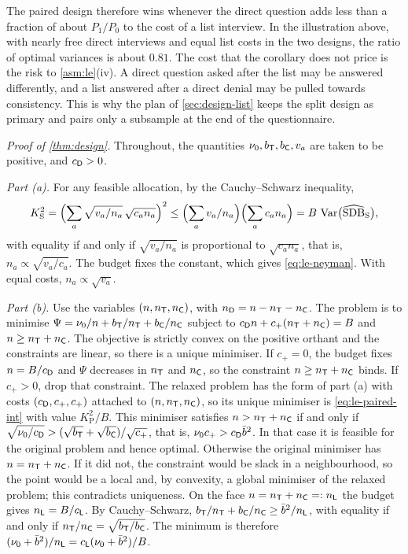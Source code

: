 The paired design therefore wins whenever the direct question adds less than a fraction of about $P_1/P_0$ to the cost of a list interview. In the illustration above, with nearly free direct interviews and equal list costs in the two designs, the ratio of optimal variances is about $0.81$. The cost that the corollary does not price is the risk to \cref{asm:le}(iv). A direct question asked after the list may be answered differently, and a list answered after a direct denial may be pulled towards consistency. This is why the plan of \cref{sec:design-list} keeps the split design as primary and pairs only a subsample at the end of the questionnaire.

\emph{Proof of \cref{thm:design}.} Throughout, the quantities $\nu_0,b_{\mathsf{T}},b_{\mathsf{C}},v_a$ are taken to be positive, and $c_{\mathsf{D}}>0$.

\emph{Part (a).} For any feasible allocation, by the Cauchy--Schwarz inequality,
\[
  K_{\mathrm S}^2=\Bigl(\sum_a\sqrt{v_a/n_a}\,\sqrt{c_an_a}\Bigr)^2\le\Bigl(\sum_av_a/n_a\Bigr)\Bigl(\sum_ac_an_a\Bigr)=B\,\operatorname{Var}\bigl(\widehat{\mathrm{SDB}}_{\mathrm S}\bigr),
\]
with equality if and only if $\sqrt{v_a/n_a}$ is proportional to $\sqrt{c_an_a}$, that is, $n_a\propto\sqrt{v_a/c_a}$. The budget fixes the constant, which gives \eqref{eq:le-neyman}. With equal costs, $n_a\propto\sqrt{v_a}$.

\emph{Part (b).} Use the variables $(n,n_{\mathsf{T}},n_{\mathsf{C}})$, with $n_{\mathsf{D}}=n-n_{\mathsf{T}}-n_{\mathsf{C}}$. The problem is to minimise $\Psi=\nu_0/n+b_{\mathsf{T}}/n_{\mathsf{T}}+b_{\mathsf{C}}/n_{\mathsf{C}}$ subject to $c_{\mathsf{D}}n+c_+(n_{\mathsf{T}}+n_{\mathsf{C}})=B$ and $n\ge n_{\mathsf{T}}+n_{\mathsf{C}}$. The objective is strictly convex on the positive orthant and the constraints are linear, so there is a unique minimiser. If $c_+=0$, the budget fixes $n=B/c_{\mathsf{D}}$ and $\Psi$ decreases in $n_{\mathsf{T}}$ and $n_{\mathsf{C}}$, so the constraint $n\ge n_{\mathsf{T}}+n_{\mathsf{C}}$ binds. If $c_+>0$, drop that constraint. The relaxed problem has the form of part (a) with costs $(c_{\mathsf{D}},c_+,c_+)$ attached to $(n,n_{\mathsf{T}},n_{\mathsf{C}})$, so its unique minimiser is \eqref{eq:le-paired-int} with value $K_{\mathrm P}^2/B$. This minimiser satisfies $n>n_{\mathsf{T}}+n_{\mathsf{C}}$ if and only if $\sqrt{\nu_0/c_{\mathsf{D}}}>(\sqrt{b_{\mathsf{T}}}+\sqrt{b_{\mathsf{C}}})/\sqrt{c_+}$, that is, $\nu_0c_+>c_{\mathsf{D}}\bar b^2$. In that case it is feasible for the original problem and hence optimal. Otherwise the original minimiser has $n=n_{\mathsf{T}}+n_{\mathsf{C}}$. If it did not, the constraint would be slack in a neighbourhood, so the point would be a local and, by convexity, a global minimiser of the relaxed problem; this contradicts uniqueness. On the face $n=n_{\mathsf{T}}+n_{\mathsf{C}}=:n_{\mathsf{L}}$ the budget gives $n_{\mathsf{L}}=B/c_{\mathsf{L}}$. By Cauchy--Schwarz, $b_{\mathsf{T}}/n_{\mathsf{T}}+b_{\mathsf{C}}/n_{\mathsf{C}}\ge\bar b^2/n_{\mathsf{L}}$, with equality if and only if $n_{\mathsf{T}}/n_{\mathsf{C}}=\sqrt{b_{\mathsf{T}}/b_{\mathsf{C}}}$. The minimum is therefore $(\nu_0+\bar b^2)/n_{\mathsf{L}}=c_{\mathsf{L}}(\nu_0+\bar b^2)/B$.

